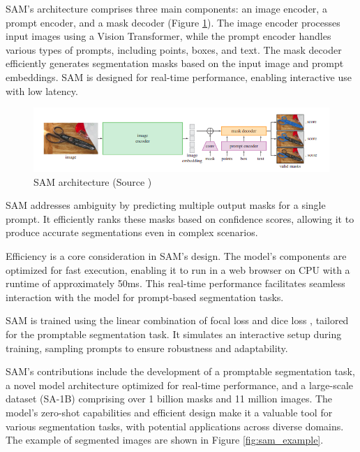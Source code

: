 SAM's architecture comprises three main components: an image encoder, a prompt encoder, and a mask decoder (Figure \ref{fig:sam_architecture}). The
image encoder processes input images using a Vision Transformer, while the prompt encoder handles various types of prompts, including points, boxes, and text. The mask decoder efficiently generates segmentation masks based on the input image and prompt embeddings. SAM is designed for real-time performance, enabling interactive use with low latency.

\begin{figure}[h]
  \centering
  \includegraphics[width=\linewidth]{text/chapter_03/imgs/sam}
  \caption{SAM architecture (Source \cite{SAM2023})}
  \label{fig:sam_architecture}
\end{figure}

SAM addresses ambiguity by predicting multiple output masks for a single prompt. It efficiently ranks these masks based on confidence scores, allowing it to produce accurate segmentations even in complex scenarios.

Efficiency is a core consideration in SAM's design. The model's components are optimized for fast execution, enabling it to run in a web browser on CPU with a runtime of approximately 50ms. This real-time performance facilitates seamless interaction with the model for prompt-based segmentation tasks.

SAM is trained using the linear combination of focal loss \cite{FocalLoss2020} and dice loss \cite{DiceLoss2016}, tailored for the
promptable segmentation
task. It simulates an interactive setup during training, sampling prompts to ensure robustness and adaptability.

SAM's contributions include the development of a promptable segmentation task, a novel model architecture optimized
for real-time performance, and a large-scale dataset (SA-1B) comprising over 1 billion masks and 11 million images.
The model's zero-shot capabilities and efficient design make it a valuable tool for various segmentation tasks, with
potential applications across diverse domains. The example of segmented images are shown in Figure \ref{fig:sam_example}.

